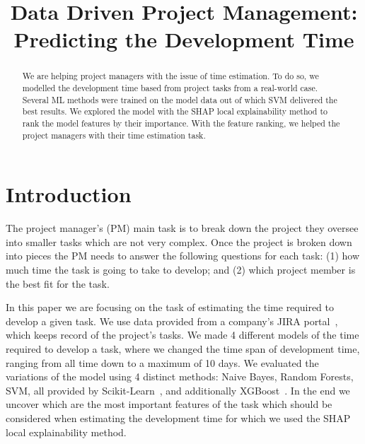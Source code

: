 \documentclass[conference,compsoc]{IEEEtran}
\begin{document}
\title{Data Driven Project Management: \\ Predicting the Development Time}


\author{
}

\maketitle

\begin{abstract}
We are helping project managers with the issue of time estimation. To do so, we modelled the development time based from project tasks from a real-world case. Several ML methods were trained on the model data out of which SVM delivered the best results. We explored the model with the SHAP local explainability method to rank the model features by their importance. With the feature ranking, we helped the project managers with their time estimation task.
\end{abstract}

\section{Introduction}

The project manager's (PM) main task is to break down the project they oversee into smaller tasks which are not very complex. Once the project is broken down into pieces the PM needs to answer the following questions for each task: (1) how much time the task is going to take to develop; and (2) which project member is the best fit for the task.

In this paper we are focusing on the task of estimating the time required to develop a given task. We use data provided from a company's JIRA portal~\cite{JIRA}, which keeps record of the project's tasks. We made 4 different models of the time required to develop a task, where we changed the time span of development time, ranging from all time down to a maximum of 10 days. We evaluated the variations of the model using 4 distinct methods: Naive Bayes, Random Forests, SVM, all provided by Scikit-Learn~\cite{scikit-learn}, and additionally XGBoost~\cite{chen2016xgboost}. In the end we uncover which are the most important features of the task which should be considered when estimating the development time for which we used the SHAP~\cite{lundberg2020local2global} local explainability method.
\end{document}
